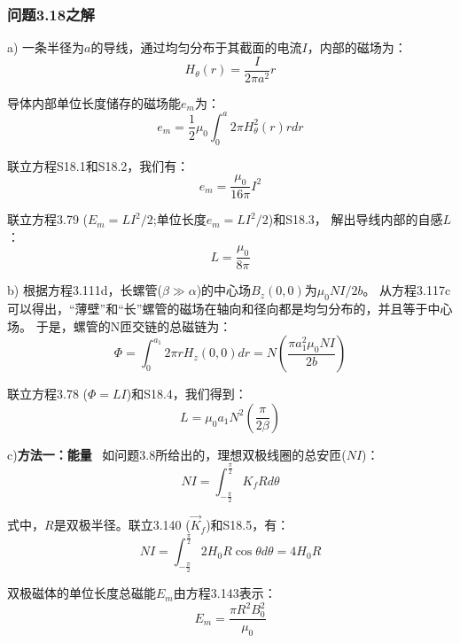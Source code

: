 \subsubsection{问题3.18之解}
a) 一条半径为$a$的导线，通过均匀分布于其截面的电流$I$，内部的磁场为：
 \begin{equation}%
H_\theta(r)=\frac{I}{2\pi a^2}r
\end{equation}

导体内部单位长度储存的磁场能$e_m$为：
 \begin{equation}%
e_m=\frac{1}{2}\mu_0\int_{0}^{a}2\pi H_{\theta}^{2}(r)rdr
\end{equation}

联立方程S18.1和S18.2，我们有：
 \begin{equation}%
e_m=\frac{\mu_0}{16\pi}I^2
\end{equation}

联立方程3.79 ($E_m =LI^2/2$;单位长度$e_m =LI^2/2$)和S18.3，
解出导线内部的自感$L$：
 \begin{equation}%
L=\frac{\mu_0}{8\pi}
\end{equation}

b) 根据方程3.111d，长螺管($\beta\gg\alpha$)的中心场$B_z(0, 0)$为$\mu_0 NI/2b$。
从方程3.117c可以得出，“薄壁”和“长”螺管的磁场在轴向和径向都是均匀分布的，并且等于中心场。
于是，螺管的N匝交链的总磁链为：
 \begin{equation}%
\Phi=\int_{0}^{a_1}2\pi rH_z(0,0)dr=N\left(\frac{\pi a_{1}^{2}\mu_0NI}{2b}\right)
\end{equation}

联立方程3.78 ($\Phi=LI$)和S18.4，我们得到：
 \begin{equation}%
L=\mu_0a_1N^2(\frac{\pi}{2\beta})
\end{equation}

c)\textbf{方法一：能量} \ 如问题3.8所给出的，理想双极线圈的总安匝($NI$)：
\begin{equation}%
NI=\int_{-\frac{\pi}{2}}^{\frac{\pi}{2}}K_f Rd\theta
\end{equation}

式中，$R$是双极半径。联立3.140 ($\vec{K}_f$)和S18.5，有：
\begin{equation}%
NI=\int_{-\frac{\pi}{2}}^{\frac{\pi}{2}}2H_0R\cos\theta d\theta=4H_0R
\end{equation}

双极磁体的单位长度总磁能$E_m$由方程3.143表示：
 \begin{equation}%
E_m=\frac{\pi R^2B_{0}^{2}}{\mu_0}
\end{equation}

